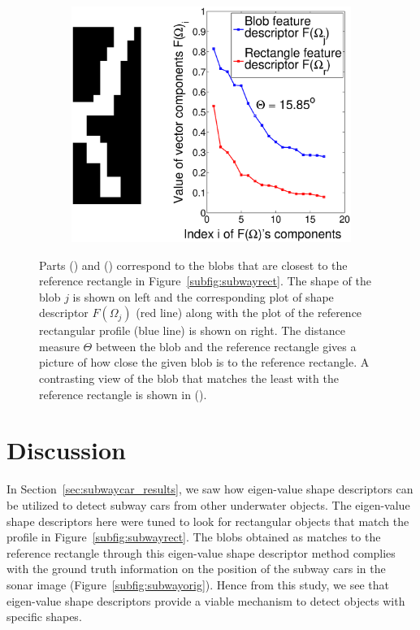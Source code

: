 \documentclass {udthesis}
\begin{document}
\begin{figure}
\begin{subfigure}[]{0.45\textwidth}
      \includegraphics[width=\textwidth]{worst1}
      \caption{}
      \label{subfig:subwayworst}
  \end{subfigure}
\caption[Subway car recognition results]{Parts () and () correspond to the blobs that are closest to the reference rectangle in Figure~\ref{subfig:subwayrect}. The shape of the blob $j$ is shown on left and the corresponding plot of shape descriptor $F(\Omega_j)$ (red line) along with the plot of the reference rectangular profile (blue line) is shown on right. The distance measure $\Theta$ between the blob and the reference rectangle gives a picture of how close the given blob is to the reference rectangle. A contrasting view of the blob that matches the least with the reference rectangle is shown in ().}
\end{figure}      


\section{Discussion}

In Section~\ref{sec:subwaycar_results}, we saw how eigen-value shape descriptors can be utilized to detect subway cars from other underwater objects. The eigen-value shape descriptors here were tuned to look for rectangular objects that match the profile in Figure~\ref{subfig:subwayrect}. The blobs obtained as matches to the reference rectangle through this eigen-value shape descriptor method complies with the ground truth information on the position of the subway cars in the sonar image (Figure~\ref{subfig:subwayorig}). Hence from this study, we see that eigen-value shape descriptors provide a viable mechanism to detect objects with specific shapes.
\end{document}
